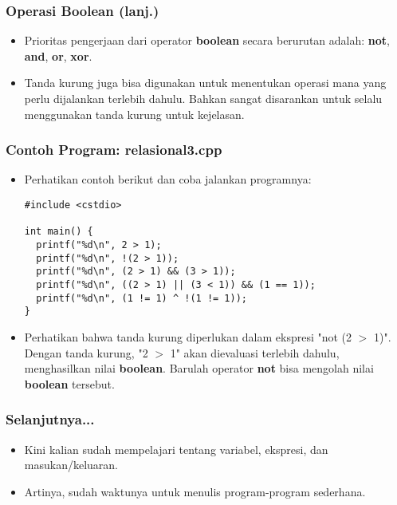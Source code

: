 \begin{frame}
\frametitle{Operasi Boolean (lanj.)}
\begin{itemize}
  \item Prioritas pengerjaan dari operator \textbf{boolean} secara berurutan adalah: \textbf{not}, \textbf{and}, \textbf{or}, \textbf{xor}.
  \item Tanda kurung juga bisa digunakan untuk menentukan operasi mana yang perlu dijalankan terlebih dahulu. Bahkan sangat disarankan untuk selalu menggunakan tanda kurung untuk kejelasan.
\end{itemize}
\end{frame}

\begin{frame}[fragile]
\frametitle{Contoh Program: relasional3.cpp}
\begin{itemize}
  \item Perhatikan contoh berikut dan coba jalankan programnya:
\begin{lstlisting}
#include <cstdio>

int main() {
  printf("%d\n", 2 > 1);
  printf("%d\n", !(2 > 1));
  printf("%d\n", (2 > 1) && (3 > 1));
  printf("%d\n", ((2 > 1) || (3 < 1)) && (1 == 1));
  printf("%d\n", (1 != 1) ^ !(1 != 1));
}\end{lstlisting}
  \item Perhatikan bahwa tanda kurung diperlukan dalam ekspresi "not (2 $>$ 1)". Dengan tanda kurung, "2 $>$ 1" akan dievaluasi terlebih dahulu, menghasilkan nilai \textbf{boolean}. Barulah operator \textbf{not} bisa mengolah nilai \textbf{boolean} tersebut.
\end{itemize}
\end{frame}

\begin{frame}
\frametitle{Selanjutnya...}
\begin{itemize}
  \item Kini kalian sudah mempelajari tentang variabel, ekspresi, dan masukan/keluaran.
  \item Artinya, sudah waktunya untuk menulis program-program sederhana.
\end{itemize}
\end{frame}


